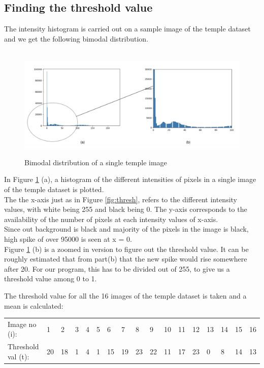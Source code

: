 \documentclass[a4paper]{report}
\begin{document}
\subsection{Finding the threshold value}
The intensity histogram is carried out on a sample image of the temple dataset and we get the following bimodal distribution.
\begin{figure}[h]
\
\hspace*{-1cm}
\includegraphics[scale=0.45]{bimodal_temple.jpg} 
\caption{Bimodal distribution of a  single temple image}
\label{fig:dist}
\end{figure}

In Figure \ref{fig:dist} (a), a histogram of the different intensities of pixels in a single image of the temple dataset is plotted. 
\\
The the x-axis just as in Figure \ref{fig:thresh}, refers to the different intensity values, with white being 255 and black being 0. The y-axis corresponds to the availability of the number of pixels at each intensity values of x-axis.
\\
Since out background is black and majority of the pixels in the image is black, high spike of over 95000 is seen at x = 0.
\\
Figure \ref{fig:dist} (b) is a zoomed in version to figure out the threshold value. It can be roughly estimated that from part(b) that the new spike would rise somewhere after 20. For our program, this has to be divided out of 255, to give us a threshold value among 0 to 1.
\newpage

The threshold value for all the 16 images of the temple dataset is taken and a mean is calculated:
\\
\begin{table}[h]
\begin{tabular}{lllllllllllllllll}
Image no (i): & 1 & 2 & 3 & 4 & 5  & 6 & 7 & 8 & 9 & 10 & 11 & 12 & 13 & 14 & 15 & 16\\
Threshold val (t): & 20 & 18 & 1 & 4 & 1 & 15 & 19 & 23 & 22 & 11 & 17 & 23 & 0 & 8 & 14 & 13 \\

\end{tabular}
\end{table}
\end{document}
